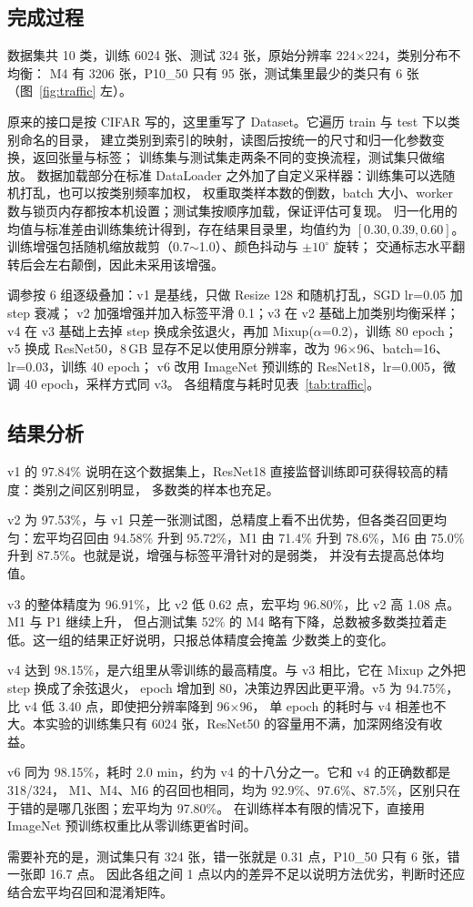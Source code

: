 \documentclass[10.5pt,a4paper,UTF8]{article}
\begin{document}
\subsection{完成过程}
数据集共 10 类，训练 6024 张、测试 324 张，原始分辨率 224$\times$224，类别分布不均衡：
M4 有 3206 张，P10\_50 只有 95 张，测试集里最少的类只有 6 张（图~\ref{fig:traffic} 左）。

原来的接口是按 CIFAR 写的，这里重写了 Dataset。它遍历 train 与 test 下以类别命名的目录，
建立类别到索引的映射，读图后按统一的尺寸和归一化参数变换，返回张量与标签；
训练集与测试集走两条不同的变换流程，测试集只做缩放。
数据加载部分在标准 DataLoader 之外加了自定义采样器：训练集可以选随机打乱，也可以按类别频率加权，
权重取类样本数的倒数，batch 大小、worker 数与锁页内存都按本机设置；测试集按顺序加载，保证评估可复现。
归一化用的均值与标准差由训练集统计得到，存在结果目录里，均值约为 $[0.30, 0.39, 0.60]$。
训练增强包括随机缩放裁剪（0.7$\sim$1.0）、颜色抖动与 $\pm10^\circ$ 旋转；
交通标志水平翻转后会左右颠倒，因此未采用该增强。

调参按 6 组逐级叠加：v1 是基线，只做 Resize 128 和随机打乱，SGD lr=0.05 加 step 衰减；
v2 加强增强并加入标签平滑 0.1；v3 在 v2 基础上加类别均衡采样；
v4 在 v3 基础上去掉 step 换成余弦退火，再加 Mixup($\alpha$=0.2)，训练 80 epoch；
v5 换成 ResNet50，8\,GB 显存不足以使用原分辨率，改为 96$\times$96、batch=16、lr=0.03，训练 40 epoch；
v6 改用 ImageNet 预训练的 ResNet18，lr=0.005，微调 40 epoch，采样方式同 v3。
各组精度与耗时见表~\ref{tab:traffic}。


\subsection{结果分析}
v1 的 97.84\% 说明在这个数据集上，ResNet18 直接监督训练即可获得较高的精度：类别之间区别明显，
多数类的样本也充足。

v2 为 97.53\%，与 v1 只差一张测试图，总精度上看不出优势，但各类召回更均匀：宏平均召回由 94.58\% 升到
95.72\%，M1 由 71.4\% 升到 78.6\%，M6 由 75.0\% 升到 87.5\%。也就是说，增强与标签平滑针对的是弱类，
并没有去提高总体均值。

v3 的整体精度为 96.91\%，比 v2 低 0.62 点，宏平均 96.80\%，比 v2 高 1.08 点。M1 与 P1 继续上升，
但占测试集 52\% 的 M4 略有下降，总数被多数类拉着走低。这一组的结果正好说明，只报总体精度会掩盖
少数类上的变化。

v4 达到 98.15\%，是六组里从零训练的最高精度。与 v3 相比，它在 Mixup 之外把 step 换成了余弦退火，
epoch 增加到 80，决策边界因此更平滑。v5 为 94.75\%，比 v4 低 3.40 点，即使把分辨率降到 96$\times$96，
单 epoch 的耗时与 v4 相差也不大。本实验的训练集只有 6024 张，ResNet50 的容量用不满，加深网络没有收益。

v6 同为 98.15\%，耗时 2.0 min，约为 v4 的十八分之一。它和 v4 的正确数都是 318/324，
M1、M4、M6 的召回也相同，均为 92.9\%、97.6\%、87.5\%，区别只在于错的是哪几张图；宏平均为 97.80\%。
在训练样本有限的情况下，直接用 ImageNet 预训练权重比从零训练更省时间。

需要补充的是，测试集只有 324 张，错一张就是 0.31 点，P10\_50 只有 6 张，错一张即 16.7 点。
因此各组之间 1 点以内的差异不足以说明方法优劣，判断时还应结合宏平均召回和混淆矩阵。
\end{document}
